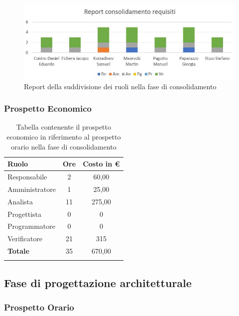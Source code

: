 \documentclass[../piano_di_progetto.tex]{subfiles}
\begin{document}
\begin{figure}[H]
\centering
\includegraphics[width=12cm]{img/report_consolidamento}
\caption{Report della suddivisione dei ruoli nella fase di consolidamento}
\end{figure}

\subsubsection{Prospetto Economico}

\begin{longtable}{|l|c|c|}
	\hline
	\rowcolor{lightgray}
	\textbf{Ruolo} & \textbf{Ore} & \textbf{Costo in €}\\
	\endhead
	\hline
	Responsabile & 2 & 60,00 \\
	Amministratore & 1 & 25,00 \\
	Analista & 11 & 275,00 \\
	Progettista & 0 & 0 \\
	Programmatore & 0 & 0 \\
	Verificatore & 21 & 315 \\
	\hline
	\textbf{Totale} & 35 & 670,00 \\
	\hline
	\rowcolor{white}
	\caption{Tabella contenente il prospetto economico in riferimento al prospetto orario nella fase di consolidamento} 
\end{longtable}


\subsection{ Fase di progettazione architetturale}%
\label{sub:fase_prog_arc}
\subsubsection{Prospetto Orario}
\end{document}
